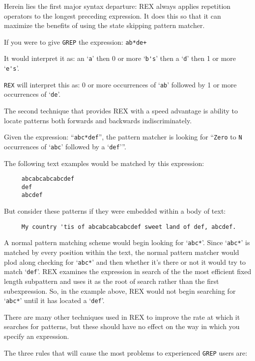 Herein lies the first major syntax departure:  REX always applies
repetition operators to the longest preceding expression.  It does
this so that it can maximize the benefits of using the state skipping
pattern matcher.

If you were to give \verb`GREP` the expression:  \verb`ab*de+`

It would interpret it as:  an `\verb`a`' then 0 or more `\verb`b's`'
then a `\verb`d`' then 1 or more `\verb`e's`'.

\verb`REX` will interpret this as:  0 or more occurrences of
`\verb`ab`' followed by 1 or more occurrences of `\verb`de`'.

The second technique that provides REX with a speed advantage is
ability to locate patterns both forwards and backwards
indiscriminately.

Given the expression:  ``\verb`abc*def`'', the pattern matcher is
looking for ``\verb`Zero` to \verb`N` occurrences of `\verb`abc`'
followed by a `\verb`def`'''.

The following text examples would be matched by this expression:

\begin{verbatim}
     abcabcabcabcdef
     def
     abcdef
\end{verbatim}

But consider these patterns if they were embedded within a body of text:

\begin{verbatim}
     My country 'tis of abcabcabcabcdef sweet land of def, abcdef.
\end{verbatim}

A normal pattern matching scheme would begin looking for
`\verb`abc*`'.  Since `\verb`abc*`' is matched by every position
within the text, the normal pattern matcher would plod along checking
for `\verb`abc*`' and then whether it's there or not it would try to
match `\verb`def`'.  REX examines the expression in search of the the
most efficient fixed length subpattern and uses it as the root of
search rather than the first subexpression.  So, in the example above,
REX would not begin searching for `\verb`abc*`' until it has located a
`\verb`def`'.

There are many other techniques used in REX to improve the rate at
which it searches for patterns, but these should have no effect on the
way in which you specify an expression.

The three rules that will cause the most problems to experienced
\verb`GREP` users are:

